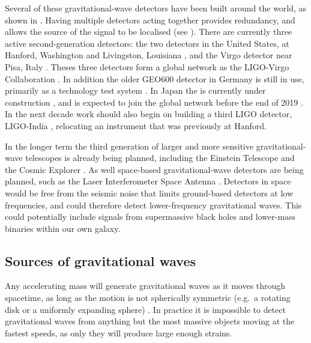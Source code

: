 \begin{colsection}
\begin{colsection}
\newpage

Several of these gravitational-wave detectors have been built around the world, as shown in . Having multiple detectors acting together provides redundancy, and allows the source of the signal to be localised (see ). There are currently three active second-generation detectors: the two  detectors in the United States, at Hanford, Washington and Livingston, Louisiana \citep{LIGO}, and the  Virgo detector near Pisa, Italy \citep{Virgo}. Theses three detectors form a global network as the LIGO-Virgo Collaboration  \citep[LVC,][]{LIGO-Virgo}. In addition the older GEO600 detector in Germany is still in use, primarily as a technology test system \citep{GEO600}. In Japan the  is currently under construction \citep{KAGRA}, and is expected to join the global network before the end of 2019 \citep{LIGO-Virgo-KAGRA}. In the next decade work should also begin on building a third LIGO detector, LIGO-India \citep{LIGO_India}, relocating an instrument that was previously at Hanford.

In the longer term the third generation of larger and more sensitive gravitational-wave telescopes is already being planned, including the Einstein Telescope \citep{EinsteinTelescope} and the Cosmic Explorer \citep{CosmicExplorer}. As well space-based gravitational-wave detectors are being planned, such as the Laser Interferometer Space Antenna  \citep[LISA,][]{LISA}. Detectors in space would be free from the seismic noise that limits ground-based detectors at low frequencies, and could therefore detect lower-frequency gravitational waves. This could potentially include signals from supermassive black holes and lower-mass binaries within our own galaxy.

\end{colsection}


\subsection{Sources of gravitational waves}
\label{sec:gw_sources}
\begin{colsection}

Any accelerating mass will generate gravitational waves as it moves through spacetime, as long as the motion is not spherically symmetric (e.g.\ a rotating disk or a uniformly expanding sphere) \citep{BIGcardiff,BIGparis}. In practice it is impossible to detect gravitational waves from anything but the most massive objects moving at the fastest speeds, as only they will produce large enough strains.


\end{colsection}
\end{colsection}
